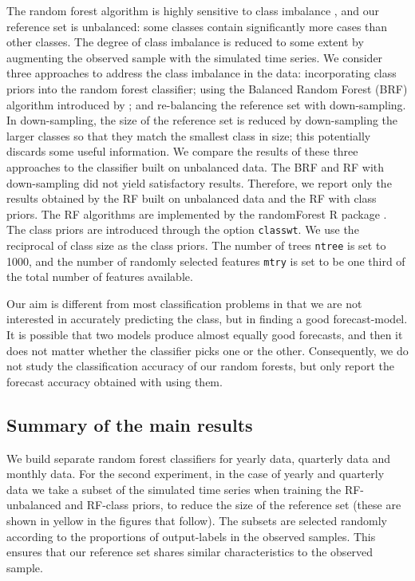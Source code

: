 \documentclass[11pt,a4paper,]{article}
\theoremstyle{definition}
\theoremstyle{definition}
\theoremstyle{definition}
\theoremstyle{remark}
\begin{document}
The random forest algorithm is highly sensitive to class imbalance
\autocite{breiman2001random}, and our reference set is unbalanced: some
classes contain significantly more cases than other classes. The degree
of class imbalance is reduced to some extent by augmenting the observed
sample with the simulated time series. We consider three approaches to
address the class imbalance in the data: incorporating class priors into
the random forest classifier; using the Balanced Random Forest (BRF)
algorithm introduced by \textcite{chen2004using}; and re-balancing the
reference set with down-sampling. In down-sampling, the size of the
reference set is reduced by down-sampling the larger classes so that
they match the smallest class in size; this potentially discards some
useful information. We compare the results of these three approaches to
the classifier built on unbalanced data. The BRF and RF with
down-sampling did not yield satisfactory results. Therefore, we report
only the results obtained by the RF built on unbalanced data and the RF
with class priors. The RF algorithms are implemented by the randomForest
R package \autocites{liaw2002randomforest}{rfpkg}. The class priors are
introduced through the option \texttt{classwt}. We use the reciprocal of
class size as the class priors. The number of trees \texttt{ntree} is
set to 1000, and the number of randomly selected features \texttt{mtry}
is set to be one third of the total number of features available.

Our aim is different from most classification problems in that we are
not interested in accurately predicting the class, but in finding a good
forecast-model. It is possible that two models produce almost equally
good forecasts, and then it does not matter whether the classifier picks
one or the other. Consequently, we do not study the classification
accuracy of our random forests, but only report the forecast accuracy
obtained with using them.

\subsection{Summary of the main results}\label{sec:results}

We build separate random forest classifiers for yearly data, quarterly
data and monthly data. For the second experiment, in the case of yearly
and quarterly data we take a subset of the simulated time series when
training the RF-unbalanced and RF-class priors, to reduce the size of
the reference set (these are shown in yellow in the figures that
follow). The subsets are selected randomly according to the proportions
of output-labels in the observed samples. This ensures that our
reference set shares similar characteristics to the observed sample.
\end{document}
